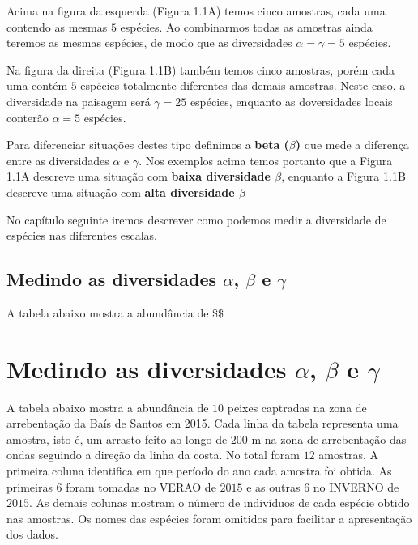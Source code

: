 \documentclass[
]{book}
\begin{document}
Acima na figura da esquerda (Figura 1.1A) temos cinco amostras, cada uma contendo as mesmas \(5\) espécies. Ao combinarmos todas as amostras ainda teremos as mesmas espécies, de modo que as diversidades \(\alpha = \gamma = 5\) espécies.

Na figura da direita (Figura 1.1B) também temos cinco amostras, porém cada uma contém \(5\) espécies totalmente diferentes das demais amostras. Neste caso, a diversidade na paisagem será \(\gamma = 25\) espécies, enquanto as doversidades locais conterão \(\alpha = 5\) espécies.

Para diferenciar situações destes tipo definimos a \textbf{beta (\(\beta\))} que mede a diferença entre as diversidades \(\alpha\) e \(\gamma\). Nos exemplos acima temos portanto que a Figura 1.1A descreve uma situação com \textbf{baixa diversidade \(\beta\)}, enquanto a Figura 1.1B descreve uma situação com \textbf{alta diversidade \(\beta\)}

No capítulo seguinte iremos descrever como podemos medir a diversidade de espécies nas diferentes escalas.

\hypertarget{medindo-as-diversidades-alpha-beta-e-gamma}{%
\section{\texorpdfstring{Medindo as diversidades \(\alpha\), \(\beta\) e \(\gamma\)}{Medindo as diversidades \textbackslash alpha, \textbackslash beta e \textbackslash gamma}}\label{medindo-as-diversidades-alpha-beta-e-gamma}}

A tabela abaixo mostra a abundância de \$\$

\hypertarget{diversidader}{%
\chapter{\texorpdfstring{Medindo as diversidades \(\alpha\), \(\beta\) e \(\gamma\)}{Medindo as diversidades \textbackslash alpha, \textbackslash beta e \textbackslash gamma}}\label{diversidader}}

A tabela abaixo mostra a abundância de \(10\) peixes captradas na zona de arrebentação da Baís de Santos em 2015. Cada linha da tabela representa uma amostra, isto é, um arrasto feito ao longo de \(200\) m na zona de arrebentação das ondas seguindo a direção da linha da costa. No total foram \(12\) amostras. A primeira coluna identifica em que período do ano cada amostra foi obtida. As primeiras 6 foram tomadas no VERAO de \(2015\) e as outras 6 no INVERNO de \(2015\). As demais colunas mostram o número de indivíduos de cada espécie obtido nas amostras. Os nomes das espécies foram omitidos para facilitar a apresentação dos dados.
\end{document}
